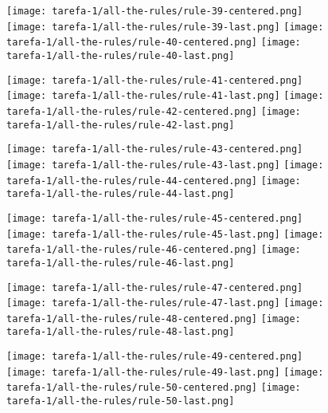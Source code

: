 \begin{figure}[htbp]
  \centering
\texttt{[image: tarefa-1/all-the-rules/rule-39-centered.png]}
\texttt{[image: tarefa-1/all-the-rules/rule-39-last.png]}
\texttt{[image: tarefa-1/all-the-rules/rule-40-centered.png]}
\texttt{[image: tarefa-1/all-the-rules/rule-40-last.png]}
\end{figure}
\begin{figure}[htbp]
  \centering
\texttt{[image: tarefa-1/all-the-rules/rule-41-centered.png]}
\texttt{[image: tarefa-1/all-the-rules/rule-41-last.png]}
\texttt{[image: tarefa-1/all-the-rules/rule-42-centered.png]}
\texttt{[image: tarefa-1/all-the-rules/rule-42-last.png]}
\end{figure}
\begin{figure}[htbp]
  \centering
\texttt{[image: tarefa-1/all-the-rules/rule-43-centered.png]}
\texttt{[image: tarefa-1/all-the-rules/rule-43-last.png]}
\texttt{[image: tarefa-1/all-the-rules/rule-44-centered.png]}
\texttt{[image: tarefa-1/all-the-rules/rule-44-last.png]}
\end{figure}
\begin{figure}[htbp]
  \centering
\texttt{[image: tarefa-1/all-the-rules/rule-45-centered.png]}
\texttt{[image: tarefa-1/all-the-rules/rule-45-last.png]}
\texttt{[image: tarefa-1/all-the-rules/rule-46-centered.png]}
\texttt{[image: tarefa-1/all-the-rules/rule-46-last.png]}
\end{figure}
\begin{figure}[htbp]
  \centering
\texttt{[image: tarefa-1/all-the-rules/rule-47-centered.png]}
\texttt{[image: tarefa-1/all-the-rules/rule-47-last.png]}
\texttt{[image: tarefa-1/all-the-rules/rule-48-centered.png]}
\texttt{[image: tarefa-1/all-the-rules/rule-48-last.png]}
\end{figure}
\begin{figure}[htbp]
  \centering
\texttt{[image: tarefa-1/all-the-rules/rule-49-centered.png]}
\texttt{[image: tarefa-1/all-the-rules/rule-49-last.png]}
\texttt{[image: tarefa-1/all-the-rules/rule-50-centered.png]}
\texttt{[image: tarefa-1/all-the-rules/rule-50-last.png]}
\end{figure}
